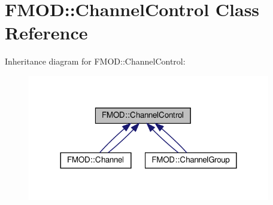 \hypertarget{classFMOD_1_1ChannelControl}{}\section{F\+M\+OD\+:\+:Channel\+Control Class Reference}
\label{classFMOD_1_1ChannelControl}


Inheritance diagram for F\+M\+OD\+:\+:Channel\+Control\+:
\nopagebreak
\begin{figure}[H]
\begin{center}
\leavevmode
\includegraphics[width=300pt]{classFMOD_1_1ChannelControl__inherit__graph}
\end{center}
\end{figure}
